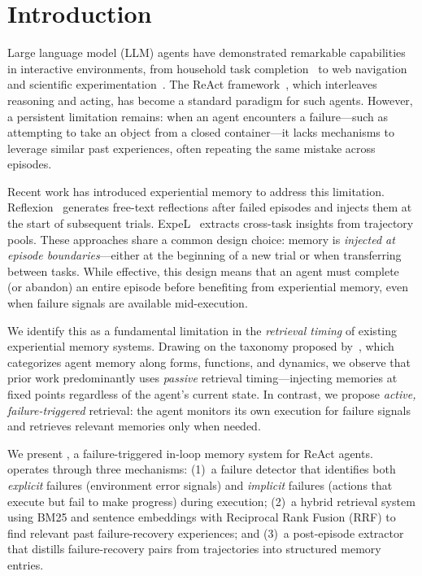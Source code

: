 \section{Introduction}
\label{sec:intro}

Large language model (LLM) agents have demonstrated remarkable capabilities in interactive environments, from household task completion~\citep{shridhar2021alfworld} to web navigation~\citep{yao2022webshop} and scientific experimentation~\citep{wang2022scienceworld}. The ReAct framework~\citep{yao2023react}, which interleaves reasoning and acting, has become a standard paradigm for such agents. However, a persistent limitation remains: when an agent encounters a failure---such as attempting to take an object from a closed container---it lacks mechanisms to leverage similar past experiences, often repeating the same mistake across episodes.

Recent work has introduced experiential memory to address this limitation. Reflexion~\citep{shinn2023reflexion} generates free-text reflections after failed episodes and injects them at the start of subsequent trials. ExpeL~\citep{zhao2024expel} extracts cross-task insights from trajectory pools. These approaches share a common design choice: memory is \emph{injected at episode boundaries}---either at the beginning of a new trial or when transferring between tasks. While effective, this design means that an agent must complete (or abandon) an entire episode before benefiting from experiential memory, even when failure signals are available mid-execution.

We identify this as a fundamental limitation in the \emph{retrieval timing} of existing experiential memory systems. Drawing on the taxonomy proposed by~\citet{liu2025memory}, which categorizes agent memory along forms, functions, and dynamics, we observe that prior work predominantly uses \emph{passive} retrieval timing---injecting memories at fixed points regardless of the agent's current state. In contrast, we propose \emph{active, failure-triggered} retrieval: the agent monitors its own execution for failure signals and retrieves relevant memories only when needed.

We present \method{}, a failure-triggered in-loop memory system for ReAct agents. \method{} operates through three mechanisms: (1)~a failure detector that identifies both \emph{explicit} failures (environment error signals) and \emph{implicit} failures (actions that execute but fail to make progress) during execution; (2)~a hybrid retrieval system using BM25 and sentence embeddings with Reciprocal Rank Fusion (RRF) to find relevant past failure-recovery experiences; and (3)~a post-episode extractor that distills failure-recovery pairs from trajectories into structured memory entries.

